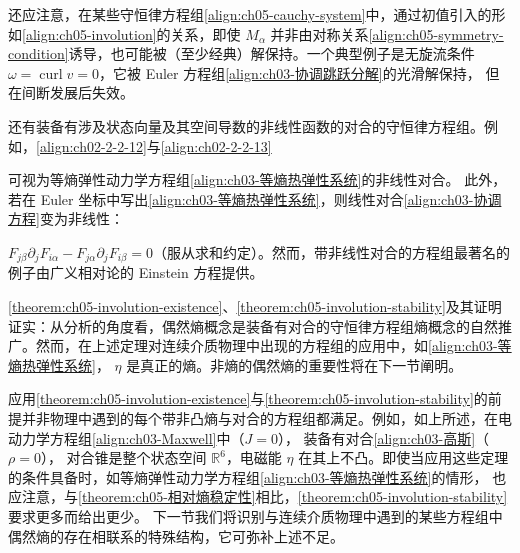 \documentclass[../../main.tex]{subfiles}
\begin{document}
还应注意，在某些守恒律方程组\eqref{align:ch05-cauchy-system}中，通过初值引入的形如\eqref{align:ch05-involution}的关系，即使 $M_{\alpha}$ 并非由对称关系\eqref{align:ch05-symmetry-condition}诱导，也可能被（至少经典）解保持。一个典型例子是无旋流条件 $\omega=\operatorname{curl}v=0$，它被 Euler 方程组\eqref{align:ch03-协调跳跃分解}的光滑解保持，
但在间断发展后失效。

还有装备有涉及状态向量及其空间导数的非线性函数的对合的守恒律方程组。例如，\eqref{align:ch02-2-2-12}与\eqref{align:ch02-2-2-13}

可视为等熵弹性动力学方程组\eqref{align:ch03-等熵热弹性系统}的非线性对合。
此外，若在 Euler 坐标中写出\eqref{align:ch03-等熵热弹性系统}，则线性对合\eqref{align:ch03-协调方程}变为非线性：

$F_{j\beta}\partial_{j}F_{i\alpha}-F_{j\alpha}\partial_{j}F_{i\beta}=0$（服从求和约定）。然而，带非线性对合的方程组最著名的例子由广义相对论的 Einstein 方程提供。

\cref{theorem:ch05-involution-existence}、\cref{theorem:ch05-involution-stability}及其证明证实：从分析的角度看，偶然熵概念是装备有对合的守恒律方程组熵概念的自然推广。然而，在上述定理对连续介质物理中出现的方程组的应用中，如\eqref{align:ch03-等熵热弹性系统}，
$\eta$ 是真正的熵。非熵的偶然熵的重要性将在下一节阐明。

应用\cref{theorem:ch05-involution-existence}与\cref{theorem:ch05-involution-stability}的前提并非物理中遇到的每个带非凸熵与对合的方程组都满足。例如，如上所述，在电动力学方程组\eqref{align:ch03-Maxwell}中（$J=0$），
装备有对合\eqref{align:ch03-高斯}（$\rho=0$），
对合锥是整个状态空间 $\mathbb{R}^{6}$，电磁能 $\eta$ 在其上不凸。即使当应用这些定理的条件具备时，如等熵弹性动力学方程组\eqref{align:ch03-等熵热弹性系统}的情形，
也应注意，与\cref{theorem:ch05-相对熵稳定性}相比，\cref{theorem:ch05-involution-stability}要求更多而给出更少。
下一节我们将识别与连续介质物理中遇到的某些方程组中偶然熵的存在相联系的特殊结构，它可弥补上述不足。
\end{document}
